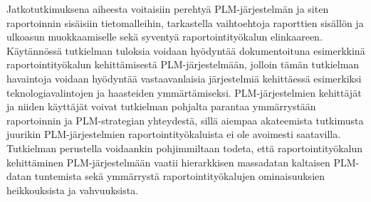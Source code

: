 Jatkotutkimuksena aiheesta voitaisiin perehtyä PLM-järjestelmän ja siten raportoinnin sisäisiin tietomalleihin, tarkastella vaihtoehtoja raporttien sisällön ja ulkoasun muokkaamiselle sekä syventyä raportointityökalun elinkaareen. Käytännössä tutkielman tuloksia voidaan hyödyntää dokumentoituna esimerkkinä raportointityökalun kehittämisestä PLM-järjestelmään, jolloin tämän tutkielman havaintoja voidaan hyödyntää vastaavanlaisia järjestelmiä kehittäessä esimerkiksi teknologiavalintojen ja haasteiden ymmärtämiseksi. PLM-järjestelmien kehittäjät ja niiden käyttäjät voivat tutkielman pohjalta parantaa ymmärrystään raportoinnin ja PLM-strategian yhteydestä, sillä aiempaa akateemista tutkimusta juurikin PLM-järjestelmien raportointityökaluista ei ole avoimesti saatavilla. Tutkielman perustella voidaankin pohjimmiltaan todeta, että raportointityökalun kehittäminen PLM-järjestelmään vaatii hierarkkisen massadatan kaltaisen PLM-datan tuntemista sekä ymmärrystä raportointityökalujen ominaisuuksien heikkouksista ja vahvuuksista.

